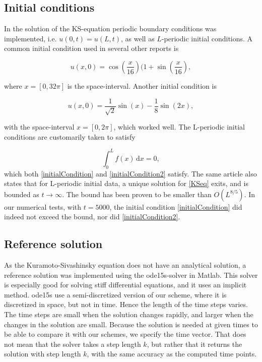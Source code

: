 \subsection{Initial conditions}
In the solution of the KS-equation periodic boundary conditions was implemented, i.e. $u(0,t) = u(L,t)$, as well as $L$-periodic initial conditions. A common initial condition used in several other reports is

\begin{equation}
\label{initialCondition}
u(x,0) = \cos(\frac{x}{16})(1 + \sin(\frac{x}{16}),
\end{equation}

where $x = [0, 32\pi]$ is the space-interval. Another initial condition is

\begin{equation}
\label{initialCondition2}
u(x,0) = \frac{1}{\sqrt{2}} \sin(x) - \frac{1}{8}\sin(2x),
\end{equation}

with the space-interval $x = [0, 2\pi]$, which worked well. The L-periodic initial conditions are customarily taken \cite{periodicInitial} to satisfy

\begin{equation}
\int_0^L\! f(x)\,\textrm{d}x = 0,
\end{equation}
which both \eqref{initialCondition} and \eqref{initialCondition2} satisfy. The same article also states that for L-periodic initial data, a unique solution for \eqref{KSeq} exits, and is bounded as $t\rightarrow\infty$. The bound has been proven to be smaller than $O(L^{8/5})$. In our numerical tests, with $t=5000$, the initial condition \eqref{initialCondition} did indeed not exceed the bound, nor did \eqref{initialCondition2}.

\subsection{Reference solution}
As the Kuramoto-Sivashinsky equation does not have an analytical solution, a reference solution was implemented using the ode15s-solver in Matlab. This solver is especially good for solving stiff differential equations, and it uses an implicit method. ode15s use a semi-discretized version of our scheme, where it is discretized in space, but not in time. Hence the length of the time steps varies. The time steps are small when the solution changes rapidly, and larger when the changes in the solution are small. Because the solution is needed at given times to be able to compare it with our schemes, we specify the time vector. That does not mean that the solver takes a step length $k$, but rather that it returns the solution with step length $k$, with the same accuracy as the computed time points. \cite{ode15s}


